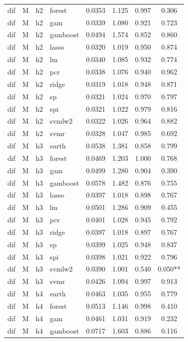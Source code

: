 \begin{ThreePartTable}
\begin{longtable}[t]{llclcccc}
dif & M & h2 & forest & 0.0353 & 1.125 & 0.997 & 0.306\\
dif & M & h2 & gam & 0.0339 & 1.080 & 0.921 & 0.723\\
dif & M & h2 & gamboost & 0.0494 & 1.574 & 0.852 & 0.860\\
dif & M & h2 & lasso & 0.0320 & 1.019 & 0.950 & 0.874\\
dif & M & h2 & lm & 0.0340 & 1.085 & 0.932 & 0.774\\
dif & M & h2 & pcr & 0.0338 & 1.076 & 0.940 & 0.962\\
dif & M & h2 & ridge & 0.0319 & 1.018 & 0.948 & 0.871\\
dif & M & h2 & sp & 0.0321 & 1.024 & 0.970 & 0.797\\
dif & M & h2 & spi & 0.0321 & 1.022 & 0.979 & 0.816\\
dif & M & h2 & svmlw2 & 0.0322 & 1.026 & 0.964 & 0.882\\
dif & M & h2 & svmr & 0.0328 & 1.047 & 0.985 & 0.692\\
\addlinespace
dif & M & h3 & earth & 0.0538 & 1.381 & 0.858 & 0.799\\
dif & M & h3 & forest & 0.0469 & 1.203 & 1.000 & 0.768\\
dif & M & h3 & gam & 0.0499 & 1.280 & 0.904 & 0.390\\
dif & M & h3 & gamboost & 0.0578 & 1.482 & 0.876 & 0.755\\
dif & M & h3 & lasso & 0.0397 & 1.018 & 0.898 & 0.767\\
dif & M & h3 & lm & 0.0501 & 1.286 & 0.909 & 0.455\\
dif & M & h3 & pcr & 0.0401 & 1.028 & 0.945 & 0.792\\
dif & M & h3 & ridge & 0.0397 & 1.018 & 0.897 & 0.767\\
dif & M & h3 & sp & 0.0399 & 1.025 & 0.948 & 0.837\\
dif & M & h3 & spi & 0.0398 & 1.021 & 0.922 & 0.796\\
dif & M & h3 & svmlw2 & 0.0390 & 1.001 & 0.540 & 0.050**\\
dif & M & h3 & svmr & 0.0426 & 1.094 & 0.997 & 0.913\\
\addlinespace
dif & M & h4 & earth & 0.0463 & 1.035 & 0.955 & 0.779\\
dif & M & h4 & forest & 0.0513 & 1.146 & 0.998 & 0.410\\
dif & M & h4 & gam & 0.0461 & 1.031 & 0.919 & 0.232\\
dif & M & h4 & gamboost & 0.0717 & 1.603 & 0.886 & 0.116\\

\end{longtable}
\end{ThreePartTable}

